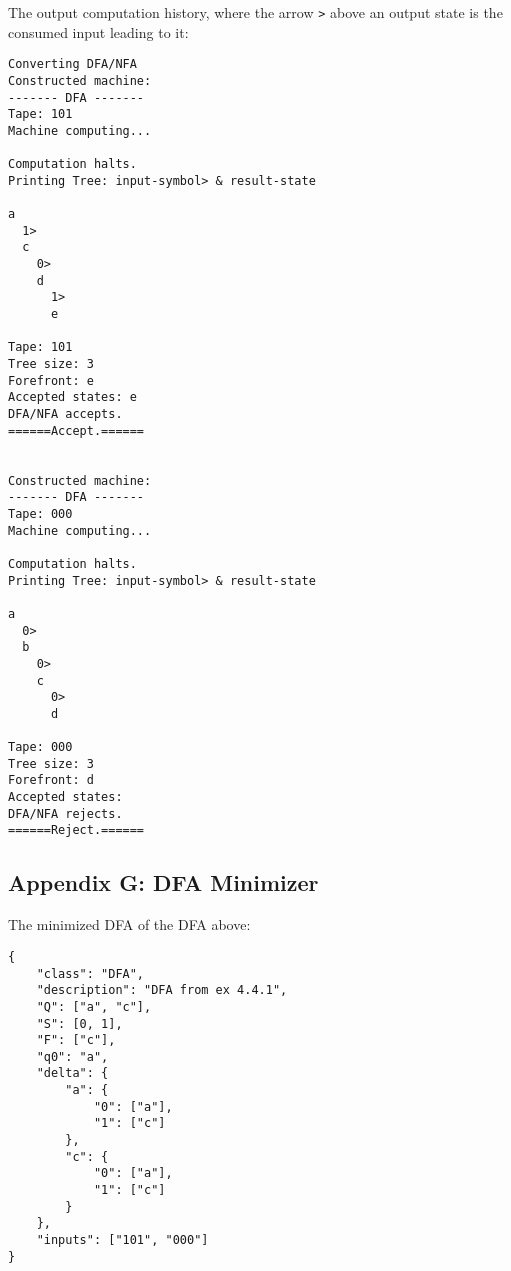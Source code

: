 \documentclass[12pt]{article}  %
\begin{document}
The output computation history, where the arrow {\tt *>} above an output state is the consumed input leading to it:
\begin{verbatim}
Converting DFA/NFA
Constructed machine:
------- DFA -------
Tape: 101
Machine computing...

Computation halts. 
Printing Tree: input-symbol> & result-state

a
  1>
  c
    0>
    d
      1>
      e

Tape: 101
Tree size: 3
Forefront: e
Accepted states: e
DFA/NFA accepts.
======Accept.======


Constructed machine:
------- DFA -------
Tape: 000
Machine computing...

Computation halts. 
Printing Tree: input-symbol> & result-state

a
  0>
  b
    0>
    c
      0>
      d

Tape: 000
Tree size: 3
Forefront: d
Accepted states: 
DFA/NFA rejects.
======Reject.======
\end{verbatim}





\subsection{Appendix G: DFA Minimizer}

The minimized DFA of the DFA above:
\begin{verbatim}
{
    "class": "DFA",
    "description": "DFA from ex 4.4.1",
    "Q": ["a", "c"],
    "S": [0, 1],
    "F": ["c"],
    "q0": "a",
    "delta": {
        "a": {
            "0": ["a"],
            "1": ["c"]
        },
        "c": {
            "0": ["a"],
            "1": ["c"]
        }
    },
    "inputs": ["101", "000"]
}
\end{verbatim}
\end{document}

